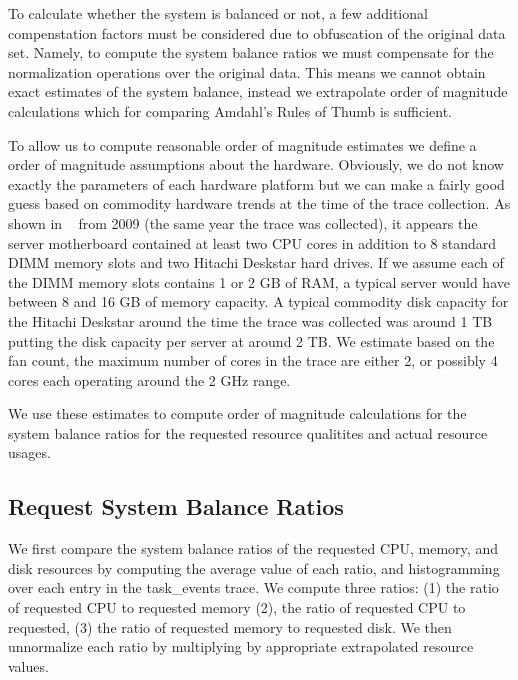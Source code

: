 \documentclass{sig-alternate}
\begin{document}
To calculate whether the system is balanced or not, a few additional compenstation factors must be considered due to obfuscation of the original data set.
Namely, to compute the system balance ratios we must compensate for the normalization operations over the original data.
This means we cannot obtain exact estimates of the system balance, instead we extrapolate order of magnitude calculations which for comparing Amdahl's Rules of Thumb is sufficient.

To allow us to compute reasonable order of magnitude estimates we define a order of magnitude assumptions about the hardware.
Obviously, we do not know exactly the parameters of each hardware platform but we can make a fairly good guess based on commodity hardware trends at the time of the trace collection.
As shown in ~\cite{googlehw} from 2009 (the same year the trace was collected), it appears the server motherboard contained at least two CPU cores in addition to 8 standard DIMM memory slots and two Hitachi Deskstar hard drives.
If we assume each of the DIMM memory slots contains 1 or 2 GB of RAM, a typical server would have between 8 and 16 GB of memory capacity.
A typical commodity disk capacity for the Hitachi Deskstar around the time the trace was collected was around 1 TB putting the disk capacity per server at around 2 TB.
We estimate based on the fan count, the maximum number of cores in the trace are either 2, or possibly 4 cores each operating around the 2 GHz range.

We use these estimates to compute order of magnitude calculations for the system balance ratios for the requested resource qualitites and actual resource usages.

\subsection{Request System Balance Ratios}

We first compare the system balance ratios of the requested CPU, memory, and disk resources by computing the average value of each ratio, and histogramming over each entry in the task\_events trace.
We compute three ratios: (1) the ratio of requested CPU to requested memory (2), the ratio of requested CPU to requested, (3) the ratio of requested memory to requested disk.
We then unnormalize each ratio by multiplying by appropriate extrapolated resource values.
\end{document}
